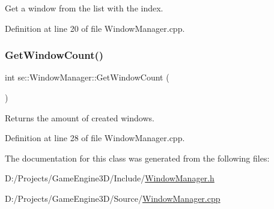 Get a window from the list with the index. 

Definition at line 20 of file Window\+Manager.\+cpp.

\mbox{\label{classse_1_1_window_manager_aec9f7b4a351181abd1a9963a33494614}} 
\subsubsection{\texorpdfstring{Get\+Window\+Count()}{GetWindowCount()}}
{\footnotesize\ttfamily int se\+::\+Window\+Manager\+::\+Get\+Window\+Count (\begin{DoxyParamCaption}{ }\end{DoxyParamCaption})}

Returns the amount of created windows. 

Definition at line 28 of file Window\+Manager.\+cpp.



The documentation for this class was generated from the following files\+:\begin{DoxyCompactItemize}
\item 
D\+:/\+Projects/\+Game\+Engine3\+D/\+Include/\mbox{\hyperlink{_window_manager_8h}{Window\+Manager.\+h}}\item 
D\+:/\+Projects/\+Game\+Engine3\+D/\+Source/\mbox{\hyperlink{_window_manager_8cpp}{Window\+Manager.\+cpp}}\end{DoxyCompactItemize}
